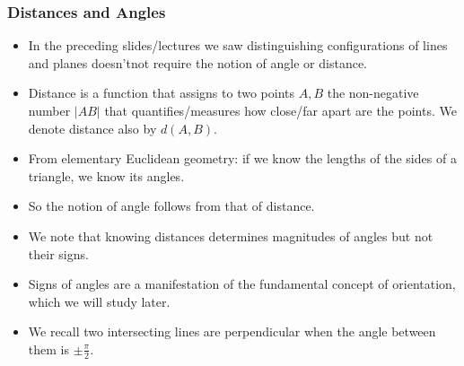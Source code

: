 \begin{frame}
\frametitle{Distances and Angles}
\begin{itemize}
\item In the preceding slides/lectures we saw distinguishing configurations of lines and planes doesn'tnot require the notion of angle or distance. 
\item<3-> Distance is a function that assigns to two points $A,B$ the non-negative number $|AB|$ that quantifies/measures how close/far apart are the points. We denote distance also by $d(A,B)$.
\item<4-> From elementary Euclidean geometry: if we know the lengths of the sides of a triangle, we know  its angles. 
\item<5-> So the notion of  angle follows from that of distance. 
\item<6-> We note that knowing distances determines \alert<6>{magnitudes of angles} but \alert<6>{not their signs}. 
\item<7-> Signs of angles are a manifestation of the fundamental concept of orientation, which we will study later.
\item<8-> We recall two intersecting lines are perpendicular when the angle between them is $\pm \frac{\pi}{2}$. 
\end{itemize}

\end{frame}